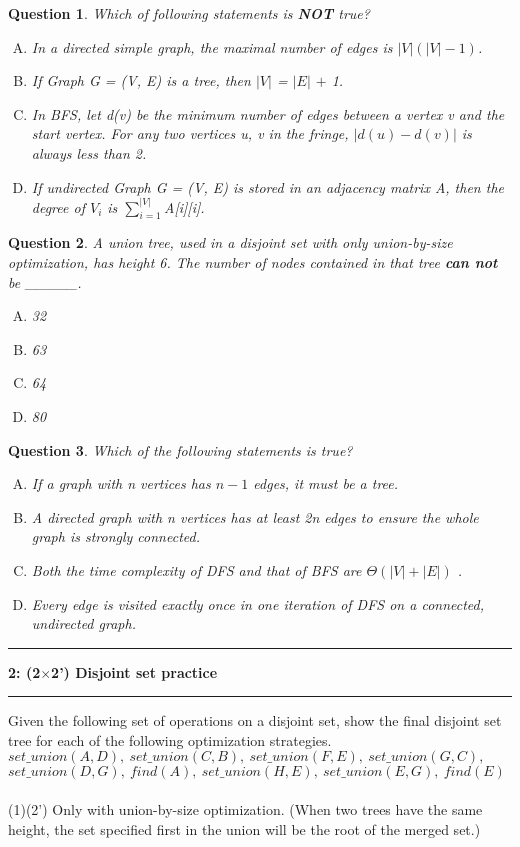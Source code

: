 \documentclass[10.5pt]{article}
\newcommand\question[2]{\vspace{.25in}\hrule\textbf{#1: #2}\vspace{.5em}\hrule\vspace{.10in}}
\newtheorem{Q}{Question}
\begin{document}
	\begin{Q}
Which of following statements is \textbf{NOT} true?
\begin{enumerate}[(A)]
	\item In a directed simple graph, the maximal number of edges is $|V|(|V|-1)$.
	\item If Graph G = (V, E) is a tree, then $|V|$ = $|E|$ $+$ 1.
	\item  In BFS, let d(v) be the minimum number of edges between a vertex v and the start vertex. For any two vertices u, v in the fringe, $|d(u)-d(v)|$ is always less than 2.
	\item If undirected Graph G = (V, E) is stored in an adjacency matrix A, then the degree of $V_i$ is $\sum_{i=1}^{|V|}$A[i][i].
\end{enumerate} 
\end{Q}

	\begin{Q} A union tree, used in a disjoint set with only union-by-size optimization, has height 6. The number of nodes contained in that tree \textbf{can not} be \_\_\_\_\_.
		\begin{enumerate}[(A)]
			\item 32
			\item 63
			\item 64
			\item 80
		\end{enumerate}
	\end{Q}
	
	\begin{Q}Which of the following statements is true?
	\begin{enumerate}[(A)]
			\item If a graph with n vertices has $n-1$ edges, it must be a tree.
			\item A directed graph with n vertices has at least 2n edges to ensure the whole graph is strongly connected.
			\item Both the time complexity of DFS and that of BFS are $\Theta(|V|+|E|)$ .
			\item Every edge is visited exactly once in one iteration of DFS on a connected, undirected graph.
		\end{enumerate}
\end{Q}
	
\pagebreak


\question{2}{(2$\times$2') Disjoint set practice}
        Given the following set of operations on a disjoint set, 
show the final disjoint set tree for each of the following optimization strategies.\\
$set\_union(A, D),\ set\_union(C, B),\ set\_union(F, E),\ set\_union (G, C),$\\
$set\_union(D,G),\ find(A),\ set\_union(H, E),\ set\_union(E,G),\ find(E)$\\
\\
(1)(2') Only with union-by-size optimization. (When two trees have the same height, the set specified first in the union will be the root of the merged set.)\\
\vspace{7cm}
\end{document}
